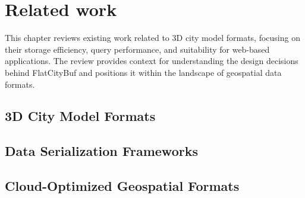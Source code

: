 \chapter{Related work}
\label{rw:related_work}
This chapter reviews existing work related to 3D city model formats, focusing on their storage efficiency, query performance, and suitability for web-based applications. The review provides context for understanding the design decisions behind FlatCityBuf and positions it within the landscape of geospatial data formats.

\section{3D City Model Formats}
\label{rw:3d_city_model_formats}

\section{Data Serialization Frameworks}
\label{rw:data_serialization_frameworks}

\section{Cloud-Optimized Geospatial Formats}
\label{rw:cloud_optimized_formats}
